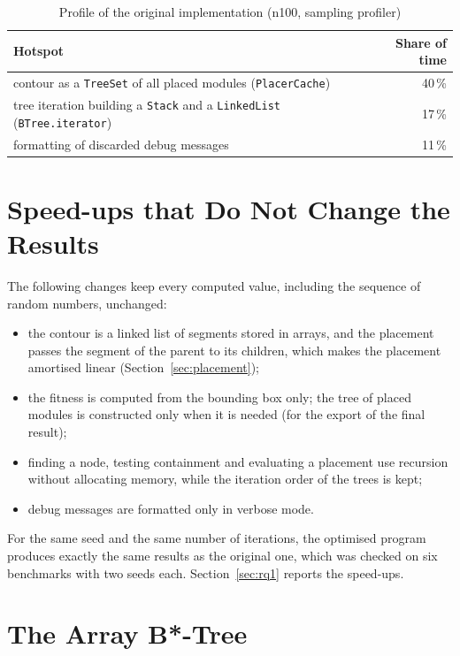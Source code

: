\begin{table}
\centering
\begin{tabular}{@{}lr@{}}
\toprule
Hotspot & Share of time \\
\midrule
contour as a {\tt TreeSet} of all placed modules ({\tt PlacerCache}) & 40\,\% \\
tree iteration building a {\tt Stack} and a {\tt LinkedList} ({\tt BTree.iterator}) & 17\,\% \\
formatting of discarded debug messages & 11\,\% \\
\bottomrule
\end{tabular}
\caption{Profile of the original implementation (n100, sampling profiler)}
\label{tab:profile}
\end{table}

\section{Speed-ups that Do Not Change the Results}

The following changes keep every computed value, including the sequence of random numbers, unchanged:
\begin{itemize}
\item the contour is a linked list of segments stored in arrays, and the placement passes the segment of the parent to its children, which makes the placement amortised linear (Section~\ref{sec:placement});
\item the fitness is computed from the bounding box only; the tree of placed modules is constructed only when it is needed (for the export of the final result);
\item finding a node, testing containment and evaluating a placement use recursion without allocating memory, while the iteration order of the trees is kept;
\item debug messages are formatted only in verbose mode.
\end{itemize}
For the same seed and the same number of iterations, the optimised program produces exactly the same results as the original one, which was checked on six benchmarks with two seeds each. Section~\ref{sec:rq1} reports the speed-ups.

\section{The Array B*-Tree}
\label{sec:arraybtree}

